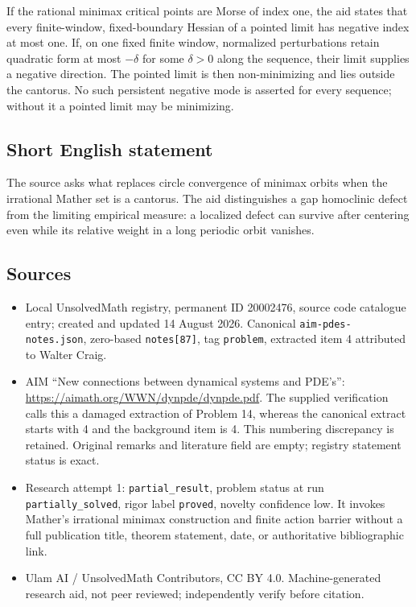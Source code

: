 \documentclass[11pt]{article}
\begin{document}
If the rational minimax critical points are Morse of index one, the aid states that every finite-window, fixed-boundary Hessian of a pointed limit has negative index at most one. If, on one fixed finite window, normalized perturbations retain quadratic form at most $-\delta$ for some $\delta>0$ along the sequence, their limit supplies a negative direction. The pointed limit is then non-minimizing and lies outside the cantorus. No such persistent negative mode is asserted for every sequence; without it a pointed limit may be minimizing.
\subsection{Short English statement}
The source asks what replaces circle convergence of minimax orbits when the irrational Mather set is a cantorus. The aid distinguishes a gap homoclinic defect from the limiting empirical measure: a localized defect can survive after centering even while its relative weight in a long periodic orbit vanishes.
\subsection{Sources}
\begin{itemize}
\item Local UnsolvedMath registry, permanent ID 20002476, source code catalogue entry; created and updated 14 August 2026. Canonical \texttt{aim-pdes-notes.json}, zero-based \texttt{notes[87]}, tag \texttt{problem}, extracted item 4 attributed to Walter Craig.
\item AIM ``New connections between dynamical systems and PDE's'': \url{https://aimath.org/WWN/dynpde/dynpde.pdf}. The supplied verification calls this a damaged extraction of Problem 14, whereas the canonical extract starts with 4 and the background item is 4. This numbering discrepancy is retained. Original remarks and literature field are empty; registry statement status is exact.
\item Research attempt 1: \texttt{partial\_result}, problem status at run \texttt{partially\_solved}, rigor label \texttt{proved}, novelty confidence low. It invokes Mather's irrational minimax construction and finite action barrier without a full publication title, theorem statement, date, or authoritative bibliographic link.
\item Ulam AI / UnsolvedMath Contributors, CC BY 4.0. Machine-generated research aid, not peer reviewed; independently verify before citation.
\end{itemize}
\end{document}
